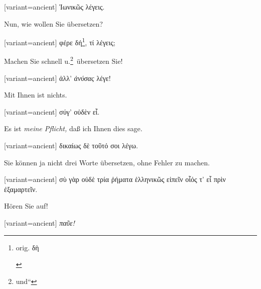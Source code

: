 \switchcolumn

\begin{greek}[variant=ancient]%
Ἰωνικῶς λέγεις.

\end{greek}%
\switchcolumn*

Nun, wie wollen Sie übersetzen?

\switchcolumn

\begin{greek}[variant=ancient]%
φέρε δή\footnote{\begin{latin}%
orig. \textgreek[variant=ancient]{δὴ}\end{latin}%
}, τί λέγεις;

\end{greek}%
\switchcolumn*

Machen Sie schnell u.\textgreek[variant=ancient]{}\footnote{\quotedblbase und``}\ übersetzen
Sie!

\switchcolumn

\begin{greek}[variant=ancient]%
ἀλλ' \emph{ἀνύσας} λέγε!

\end{greek}%
\switchcolumn*

Mit Ihnen ist nichts.

\switchcolumn

\begin{greek}[variant=ancient]%
σύγ' οὐδὲν εἶ.

\end{greek}%
\switchcolumn*

Es ist \emph{meine Pflicht,} daß ich Ihnen dies sage.

\switchcolumn

\begin{greek}[variant=ancient]%
δικαίως δὲ τοῦτό σοι λέγω.

\end{greek}%
\switchcolumn*

Sie können ja nicht drei Worte übersetzen, ohne Fehler zu machen.

\switchcolumn

\begin{greek}[variant=ancient]%
σὺ γὰρ οὐδὲ τρία ῥήματα ἑλληνικῶς εἰπεῖν οἷός τ' εἶ πρὶν ἐξαμαρτεῖν.

\end{greek}%
\switchcolumn*

Hören Sie auf!

\switchcolumn

\begin{greek}[variant=ancient]%
\emph{παῦε!}

\end{greek}%
\switchcolumn*

